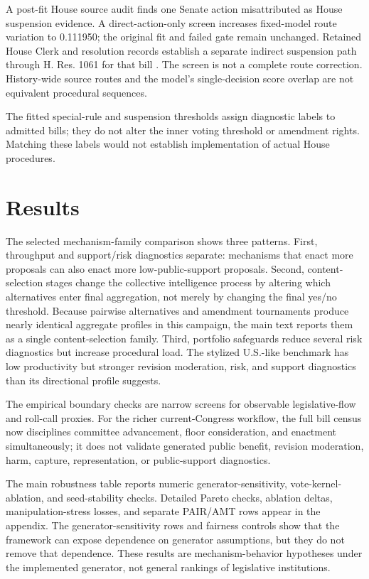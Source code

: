 \documentclass[manuscript]{acmart}
\begin{document}
A post-fit House source audit finds one Senate action misattributed as House suspension evidence. A direct-action-only screen increases fixed-model route variation to 0.111950; the original fit and failed gate remain unchanged. Retained House Clerk and resolution records establish a separate indirect suspension path through H. Res. 1061 for that bill \citep{HouseRollCall2024064,HouseResolution1061EH}. The screen is not a complete route correction. History-wide source routes and the model's single-decision score overlap are not equivalent procedural sequences.

The fitted special-rule and suspension thresholds assign diagnostic labels to admitted bills; they do not alter the inner voting threshold or amendment rights. Matching these labels would not establish implementation of actual House procedures.



\section{Results}

The selected mechanism-family comparison shows three patterns. First, throughput and support/risk diagnostics separate: mechanisms that enact more proposals can also enact more low-public-support proposals. Second, content-selection stages change the collective intelligence process by altering which alternatives enter final aggregation, not merely by changing the final yes/no threshold. Because pairwise alternatives and amendment tournaments produce nearly identical aggregate profiles in this campaign, the main text reports them as a single content-selection family. Third, portfolio safeguards reduce several risk diagnostics but increase procedural load. The stylized U.S.-like benchmark has low productivity but stronger revision moderation, risk, and support diagnostics than its directional profile suggests.

The empirical boundary checks are narrow screens for observable legislative-flow and roll-call proxies. For the richer current-Congress workflow, the full bill census now disciplines committee advancement, floor consideration, and enactment simultaneously; it does not validate generated public benefit, revision moderation, harm, capture, representation, or public-support diagnostics.

The main robustness table reports numeric generator-sensitivity, vote-kernel-ablation, and seed-stability checks. Detailed Pareto checks, ablation deltas, manipulation-stress losses, and separate PAIR/AMT rows appear in the appendix. The generator-sensitivity rows and fairness controls show that the framework can expose dependence on generator assumptions, but they do not remove that dependence. These results are mechanism-behavior hypotheses under the implemented generator, not general rankings of legislative institutions.
\end{document}
